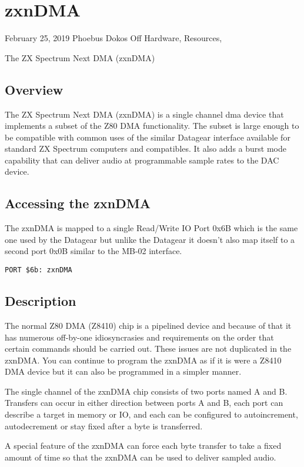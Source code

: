 \chapter{zxnDMA}
 February 25, 2019  Phoebus Dokos  Off  Hardware, Resources,

The ZX Spectrum Next DMA (zxnDMA)

\section{Overview}

The ZX Spectrum Next DMA (zxnDMA) is a single channel dma device that
implements a subset of the Z80 DMA functionality. The subset is large
enough to be compatible with common uses of the similar Datagear
interface available for standard ZX Spectrum computers and
compatibles. It also adds a burst mode capability that can deliver
audio at programmable sample rates to the DAC device.

\section{Accessing the zxnDMA}
The zxnDMA is mapped to a single Read/Write IO Port 0x6B which is the
same one used by the Datagear but unlike the Datagear it doesn't also
map itself to a second port 0x0B similar to the MB-02 interface.

\begin{verbatim}
PORT $6b: zxnDMA
\end{verbatim}

\section{Description}
The normal Z80 DMA (Z8410) chip is a pipelined device and because of
that it has numerous off-by-one idiosyncrasies and requirements on the
order that certain commands should be carried out. These issues are
not duplicated in the zxnDMA. You can continue to program the zxnDMA
as if it is were a Z8410 DMA device but it can also be programmed in a
simpler manner.

The single channel of the zxnDMA chip consists of two ports named A
and B. Transfers can occur in either direction between ports A and B,
each port can describe a target in memory or IO, and each can be
configured to autoincrement, autodecrement or stay fixed after a byte
is transferred.

A special feature of the zxnDMA can force each byte transfer to take a
fixed amount of time so that the zxnDMA can be used to deliver sampled
audio.

